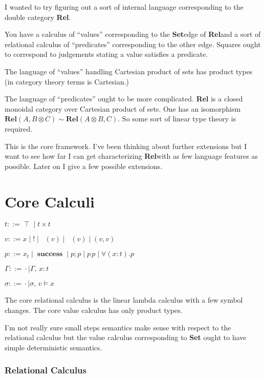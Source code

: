 \documentclass[twocolumn]{scrartcl}
\newcommand{\Rel}{\textbf{Rel}}
\newcommand{\Set}{\textbf{Set}}
\newcommand{\bnfdef}{\mathrel{::=}}
\DeclareMathOperator{\unit}{\top}
\DeclareMathOperator{\coin}{\textbf{!}}
\DeclareMathOperator{\fst}{\pi_1}
\DeclareMathOperator{\snd}{\pi_2}
\DeclareMathOperator{\success}{\textbf{success}}
\newcommand{\pass}{;}
\begin{document}
I wanted to try figuring out a sort of internal language corresponding
to the double category \Rel.

You have a calculus of ``values'' corresponding to the \Set edge of
\Rel and a sort of relational calculus of ``predicates'' corresponding
to the other edge. Squares ought to correspond to judgements stating a
value satisfies a predicate.

The language of ``values'' handling Cartesian product of sets has
product types (in category theory terms is Cartesian.)

The language of ``predicates'' ought to be more complicated. \Rel
is a closed monoidal category over Cartesian product of sets.  One has
an isomorphism \( \Rel(A, B \otimes C) \sim \Rel (A \otimes B, C) \).
So some sort of linear type theory is required.

This is the core framework.  I've been thinking about further
extensions but I want to see how far I can get characterizing
\Rel with as few language features as possible.  Later on I
give a few possible extensions.

\section*{Core Calculi}

\begin{description}[nosep]
\item[Types] \hfill \( t \bnfdef \unit \mid t \times t \)
\item[Values] \hfill \( v \bnfdef x \mid \coin \mid \fst(v) \mid \snd(v) \mid ( v , v ) \)
\item[Predicates] \hfill \( p \bnfdef x_t \mid \success \mid p \pass p \mid p \, p \mid \forall (x \colon t) . p \)
\item[Environment] \hfill \( \Gamma \bnfdef \cdot \mid \Gamma , \, x \colon t  \)
\item[Substitutions] \hfill \( \sigma \bnfdef \cdot \mid \sigma , \, v \models x  \)
\end{description}

The core relational calculus is the linear lambda calculus with a few
symbol changes.  The core value calculus has only product types.

I'm not really sure small steps semantics make sense with respect to
the relational calculus but the value calculus corresponding to \Set
ought to have simple deterministic semantics.

\subsubsection*{Relational Calculus}
\end{document}
